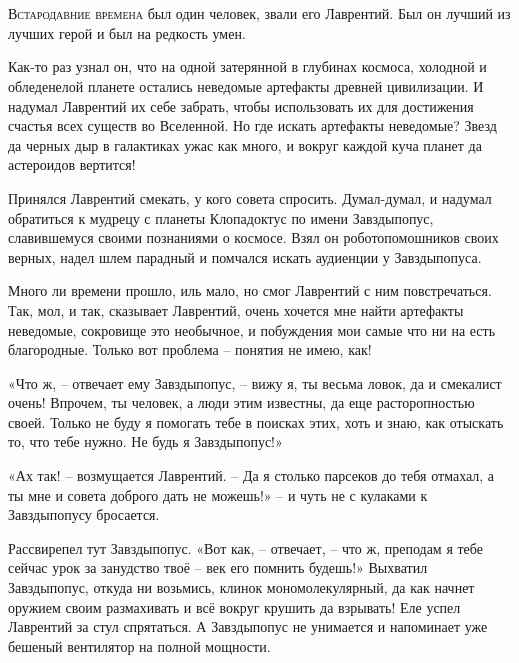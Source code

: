 \documentclass[ebook,oneside,final,openright]{memoir}
\begin{document}
\chapter{}
 \lettrine{В}{стародавние времена} был один человек, звали его Лаврентий. Был он лучший из лучших герой и был на редкость умен.\par
\par
Как-то раз узнал он, что на одной затерянной в глубинах космоса, холодной и обледенелой планете остались неведомые артефакты древней цивилизации. И надумал Лаврентий их себе забрать, чтобы использовать их для достижения счастья всех существ во Вселенной. Но где искать артефакты неведомые? Звезд да черных дыр в галактиках ужас как много, и вокруг каждой куча планет да астероидов вертится!\par
\par
Принялся Лаврентий смекать, у кого совета спросить. Думал-думал, и надумал обратиться к мудрецу с планеты Клопадоктус по имени Завздыпопус, славившемуся своими познаниями о космосе. Взял он роботопомошников своих верных, надел шлем парадный и помчался искать аудиенции у Завздыпопуса.\par
\par
Много ли времени прошло, иль мало, но смог Лаврентий с ним повстречаться. Так, мол, и так, сказывает Лаврентий, очень хочется мне найти артефакты неведомые, сокровище это необычное, и побуждения мои самые что ни на есть благородные. Только вот проблема – понятия не имею, как!\par
\par
«Что ж, – отвечает ему Завздыпопус, – вижу я, ты весьма ловок, да и смекалист очень! Впрочем, ты человек, а люди этим известны, да еще расторопностью своей. Только не буду я помогать тебе в поисках этих, хоть и знаю, как отыскать то, что тебе нужно. Не будь я Завздыпопус!» \par
\par
«Ах так! – возмущается Лаврентий. – Да я столько парсеков до тебя отмахал, а ты мне и совета доброго дать не можешь!» – и чуть не с кулаками к Завздыпопусу бросается. \par
\par
Рассвирепел тут Завздыпопус. «Вот как, – отвечает, – что ж, преподам я тебе сейчас урок за занудство твоё – век его помнить будешь!» Выхватил Завздыпопус, откуда ни возьмись, клинок мономолекулярный, да как начнет оружием своим размахивать и всё вокруг крушить да взрывать! Еле успел Лаврентий за стул спрятаться. А Завздыпопус не унимается и напоминает уже бешеный вентилятор на полной мощности. \par
\end{document}
